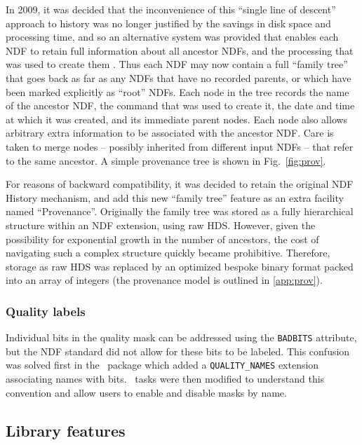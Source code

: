 \documentclass[final,authoryear,5p,times,twocolumn]{elsarticle}
\begin{document}
In 2009, it was decided that the inconvenience of this ``single line of
descent'' approach to history was no longer justified by the savings in
disk space and processing time, and so an alternative system was
provided that enables each NDF to retain full information about all
ancestor NDFs, and the processing that was used to create them \citep{2009ASPC..411..418J,2011tfa..confE..42J}. Thus
each NDF may now contain a full ``family tree'' that goes back as far as
any NDFs that have no recorded parents, or which have been marked
explicitly as ``root'' NDFs. Each node in the tree records the name of
the ancestor NDF, the command that was used to create it, the date and
time at which it was created, and its immediate parent nodes. Each
node also allows arbitrary extra information to be associated with the
ancestor NDF. Care is taken to merge nodes -- possibly inherited from
different input NDFs -- that refer to the same ancestor. A simple
provenance tree is shown in Fig.~\ref{fig:prov}.

For reasons of backward compatibility, it was decided to retain the
original NDF History mechanism, and add this new ``family tree''
feature as an extra facility named ``Provenance''.  Originally the
family tree was stored as a fully hierarchical structure within an NDF
extension, using raw HDS. However, given the possibility for
exponential growth in the number of ancestors, the cost of navigating
such a complex structure quickly became prohibitive. Therefore,
storage as raw HDS was replaced by an optimized bespoke binary format
packed into an array of integers (the provenance model is outlined in
\ref{app:prov}).

\subsubsection{Quality labels}

Individual bits in the quality mask can be addressed using the
\texttt{BADBITS} attribute, but the NDF standard did not allow for
these bits to be labeled. This confusion was solved first in the
\iras\ package \citep[][]{SUN165} which added a \texttt{QUALITY\_NAMES}
extension associating names with bits. \KAPPA\ tasks \citep[][]{SUN95} were then
modified to understand this convention and allow users to enable and
disable masks by name.

\subsection{Library features}
\end{document}
